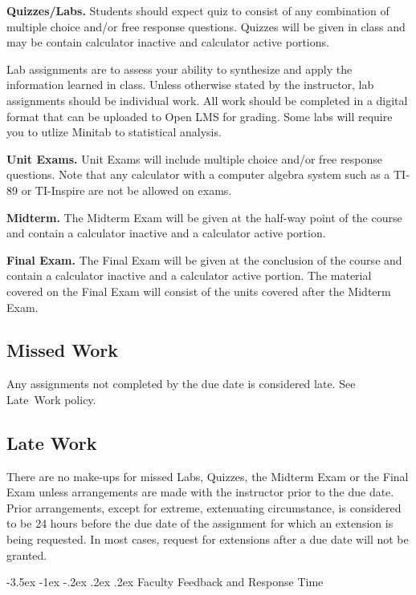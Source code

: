 \documentclass{article}
\makeatletter
\renewcommand\section{\@startsection{section}{1}{0pt}%
  {-3.5ex \@plus -1ex \@minus -.2ex}%
  {.2ex \@plus.2ex}%
  {\normalfont\Large\bfseries}} %
\makeatother
\begin{document}
\textbf{Quizzes/Labs.} Students should expect quiz to consist of any combination of multiple choice and/or free response questions. Quizzes will be given in class and may be contain calculator inactive and calculator active portions.

Lab assignments are to assess your ability to synthesize and apply the information learned in class. Unless otherwise stated by the instructor, lab assignments should be individual work. All work should be completed in a digital format that can be uploaded to Open LMS for grading. Some labs will require you to utlize Minitab to statistical analysis.

\textbf{Unit Exams.} Unit Exams will include multiple choice and/or free response questions. Note that any calculator with a computer algebra system such as a TI-89 or TI-Inspire are not be allowed on exams.

\textbf{Midterm.} The Midterm Exam will be given at the half-way point of the course and contain a calculator inactive and a calculator active portion.

\textbf{Final Exam.} The Final Exam will be given at the conclusion of the course and contain a calculator inactive and a calculator active portion. The material covered on the Final Exam will consist of the units covered after the Midterm Exam.

\subsection{Missed Work}

Any assignments not completed by the due date is considered late. See Late~Work policy.

\subsection{Late Work}\label{late-work}

There are no make-ups for missed Labs, Quizzes, the Midterm Exam or the Final Exam unless arrangements are made with the instructor prior to the due date. Prior arrangements, except for extreme, extenuating circumstance, is considered to be 24 hours before the due date of the assignment for which an extension is being requested. In most cases, request for extensions after a due date will not be granted.

\section{Faculty Feedback and Response Time}
\end{document}
